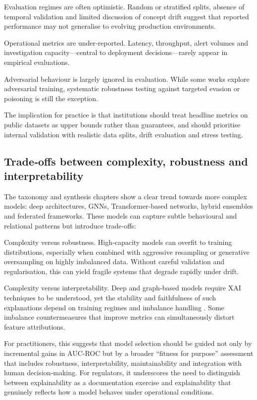 \documentclass[a4paper,fleqn]{cas-dc}
\begin{document}
Evaluation regimes are often optimistic. 
Random or stratified splits, absence of temporal validation and limited discussion of concept drift suggest that reported performance may not generalise to evolving production environments.

Operational metrics are under‑reported. 
Latency, throughput, alert volumes and investigation capacity—central to deployment decisions—rarely appear in empirical evaluations.  

Adversarial behaviour is largely ignored in evaluation. 
While some works explore adversarial training, systematic robustness testing against targeted evasion or poisoning is still the exception.

The implication for practice is that institutions should treat headline metrics on public datasets as upper bounds rather than guarantees, and should prioritise internal validation with realistic data splits, drift evaluation and stress testing.

\subsection{Trade‑offs between complexity, robustness and interpretability}

The taxonomy and synthesis chapters show a clear trend towards more complex models: 
deep architectures, GNNs, Transformer‑based networks, hybrid ensembles and federated frameworks. 
These models can capture subtle behavioural and relational patterns but introduce trade‑offs:

Complexity versus robustness. 
High‑capacity models can overfit to training distributions, especially when combined with aggressive resampling or generative oversampling on highly imbalanced data.
Without careful validation and regularisation, this can yield fragile systems that degrade rapidly under drift.

Complexity versus interpretability. Deep and graph‑based models require XAI techniques to be understood, yet the stability and faithfulness of such explanations depend on training regimes and imbalance handling \cite{krishnavardhan_intelligent_2024}. 
Some imbalance countermeasures that improve metrics can simultaneously distort feature attributions.

For practitioners, this suggests that model selection should be guided not only by incremental gains in AUC‑ROC but by a broader “fitness for purpose” assessment that includes robustness, interpretability, maintainability and integration with human decision‑making. For regulators, it underscores the need to distinguish between explainability as a documentation exercise and explainability that genuinely reflects how a model behaves under operational conditions.
\end{document}
